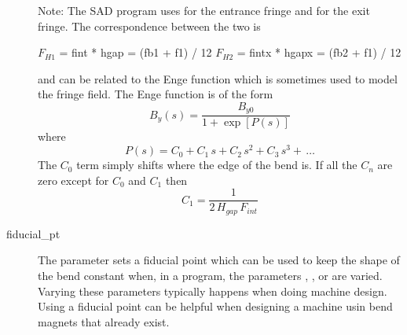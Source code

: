 \begin{description}
Note: The SAD program uses  for the entrance fringe and  for the exit
fringe. The correspondence between the two is
\begin{example2}
  \(F_{H1}\) = fint  * hgap  = (fb1 + f1) / 12
  \(F_{H2}\) = fintx * hgapx = (fb2 + f1) / 12
\end{example2}

 and  can be related to the Enge function which is sometimes used to model the
fringe field. The Enge function is of the form
\begin{equation}
  B_y(s) = \frac{B_{y0}}{1 + \exp[P(s)]}
\end{equation}
where
\begin{equation}
  P(s) = C_0 + C_1 \, s + C_2 \, s^2 + C_3 \, s^3 + \, \ldots
\end{equation}
The $C_0$ term simply shifts where the edge of the bend is. If all the $C_n$ are zero except for
$C_0$ and $C_1$ then
\begin{equation}
  C_1 = \frac{1}{2 \,H_{gap} \, F_{int}}
\end{equation}
  \item[fiducial_pt] \Newline
The  parameter sets a fiducial point which can be used to keep the shape of the bend
constant when, in a program, the parameters , ,  or  are varied.
Varying these parameters typically happens when doing machine design. Using a fiducial point can be
helpful when designing a machine usin bend magnets that already exist.


\end{description}
